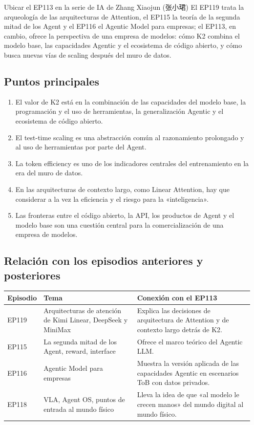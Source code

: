 \begin{importantbox}{Ubicar el EP113 en la serie de IA de Zhang Xiaojun (张小珺)}
El EP119 trata la arqueología de las arquitecturas de Attention, el EP115 la teoría de la segunda mitad de los Agent y el EP116 el Agentic Model para empresas; el EP113, en cambio, ofrece la perspectiva de una empresa de modelos: cómo K2 combina el modelo base, las capacidades Agentic y el ecosistema de código abierto, y cómo busca nuevas vías de scaling después del muro de datos.
\end{importantbox}

\subsection{Puntos principales}

\begin{enumerate}
\item El valor de K2 está en la combinación de las capacidades del modelo base, la programación y el uso de herramientas, la generalización Agentic y el ecosistema de código abierto.
\item El test-time scaling es una abstracción común al razonamiento prolongado y al uso de herramientas por parte del Agent.
\item La token efficiency es uno de los indicadores centrales del entrenamiento en la era del muro de datos.
\item En las arquitecturas de contexto largo, como Linear Attention, hay que considerar a la vez la eficiencia y el riesgo para la «inteligencia».
\item Las fronteras entre el código abierto, la API, los productos de Agent y el modelo base son una cuestión central para la comercialización de una empresa de modelos.
\end{enumerate}

\subsection{Relación con los episodios anteriores y posteriores}

\begin{tabularx}{\textwidth}{p{}p{}X}
\toprule
Episodio & Tema & Conexión con el EP113 \\
\midrule
EP119 & Arquitecturas de atención de Kimi Linear, DeepSeek y MiniMax & Explica las decisiones de arquitectura de Attention y de contexto largo detrás de K2. \\
EP115 & La segunda mitad de los Agent, reward, interface & Ofrece el marco teórico del Agentic LLM. \\
EP116 & Agentic Model para empresas & Muestra la versión aplicada de las capacidades Agentic en escenarios ToB con datos privados. \\
EP118 & VLA, Agent OS, puntos de entrada al mundo físico & Lleva la idea de que «al modelo le crecen manos» del mundo digital al mundo físico. \\
\bottomrule
\end{tabularx}

